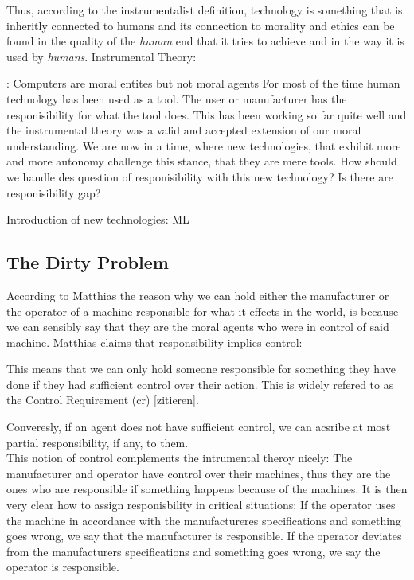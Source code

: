 \documentclass{article}
\begin{document}
Thus, according to the instrumentalist definition, technology is something that
is inheritly connected to humans and its connection to morality and ethics can
be found in the quality of the \textit{human} end that it tries to achieve and in the way
it is used by \textit{humans}.
Instrumental Theory:

\cite{johnson2006computer}: Computers are moral entites but not moral agents
For most of the time human technology has been used as a tool.
The user or manufacturer has the responisibility for what the tool does.
This has been working so far quite well and the instrumental theory was a valid
and accepted extension of our moral understanding.
We are now in a time, where new technologies, that exhibit more and more
autonomy challenge this stance, that they are mere tools. How should we handle
des question of responisibility with this new technology? Is there are
responisibility gap?

Introduction of new technologies: ML

\subsection{The Dirty Problem}

According to Matthias \cite{Matthias_2004} the reason why we can hold either the
manufacturer or the operator of a machine responsible for what it effects in the
world, is because we can sensibly say that they are the moral agents who were in
control of said machine. Matthias claims that responsibility implies control:

\vspace{.8em}
 \cite[p.175]{Matthias_2004}

\vspace{.8em}
This means that we can only hold someone responsible for something they have
done if they had sufficient control over their action.
This is widely refered to as the Control Requirement (\acrshort{cr}) [zitieren].

Converesly, if an agent does not have sufficient control, we can acsribe at most
partial responsibility, if any, to them.\\
This notion of control complements the intrumental theroy nicely: The
manufacturer and operator have control over their machines, thus they are the
ones who are responsible if something happens because of the machines.
It is then very clear how to assign responisbility in critical situations: If the operator uses the
machine in accordance with the manufactureres specifications and something goes
wrong, we say that the manufacturer is responsible. If the operator deviates
from the manufacturers specifications and something goes wrong, we say the
operator is responsible.
\end{document}

